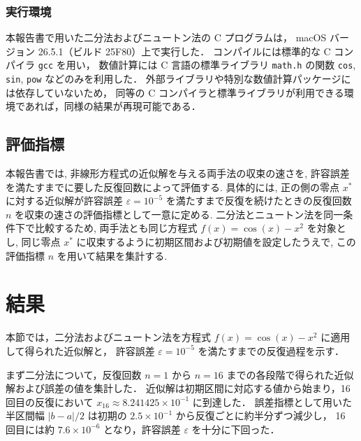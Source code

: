 \documentclass[a4paper,fontsize=11pt,line_length=40zw,number_of_lines=35,baselineskip=1.7zw]{jlreq}
\begin{document}
\subsubsection{実行環境}
本報告書で用いた二分法およびニュートン法の C プログラムは，
macOS バージョン 26.5.1（ビルド 25F80）上で実行した．
コンパイルには標準的な C コンパイラ \texttt{gcc} を用い，
数値計算には C 言語の標準ライブラリ \texttt{math.h} の関数
\texttt{cos}, \texttt{sin}, \texttt{pow} などのみを利用した．
外部ライブラリや特別な数値計算パッケージには依存していないため，
同等の C コンパイラと標準ライブラリが利用できる環境であれば，同様の結果が再現可能である．

\subsection{評価指標}
本報告書では, 非線形方程式の近似解を与える両手法の収束の速さを, 許容誤差を満たすまでに要した反復回数によって評価する. 
具体的には, 正の側の零点 $x^*$ に対する近似解が許容誤差 $\varepsilon = 10^{-5}$ を満たすまで反復を続けたときの反復回数 $n$ を収束の速さの評価指標として一意に定める.
二分法とニュートン法を同一条件下で比較するため, 両手法とも同じ方程式 $f(x)=\cos(x)-x^2$ を対象とし,
同じ零点 $x^*$ に収束するように初期区間および初期値を設定したうえで, この評価指標 $n$ を用いて結果を集計する.

\section{結果}
本節では，二分法およびニュートン法を方程式 $f(x)=\cos(x)-x^2$ に適用して得られた近似解と，
許容誤差 $\varepsilon = 10^{-5}$ を満たすまでの反復過程を示す．



まず二分法について，反復回数 $n=1$ から $n=16$ までの各段階で得られた近似解および誤差の値を集計した．
近似解は初期区間に対応する値から始まり，16 回目の反復において $x_{16}\approx 8.241425\times 10^{-1}$ に到達した．
誤差指標として用いた半区間幅 $|b-a|/2$ は初期の $2.5\times 10^{-1}$ から反復ごとに約半分ずつ減少し，
16 回目には約 $7.6\times 10^{-6}$ となり，許容誤差 $\varepsilon$ を十分に下回った．
\end{document}
